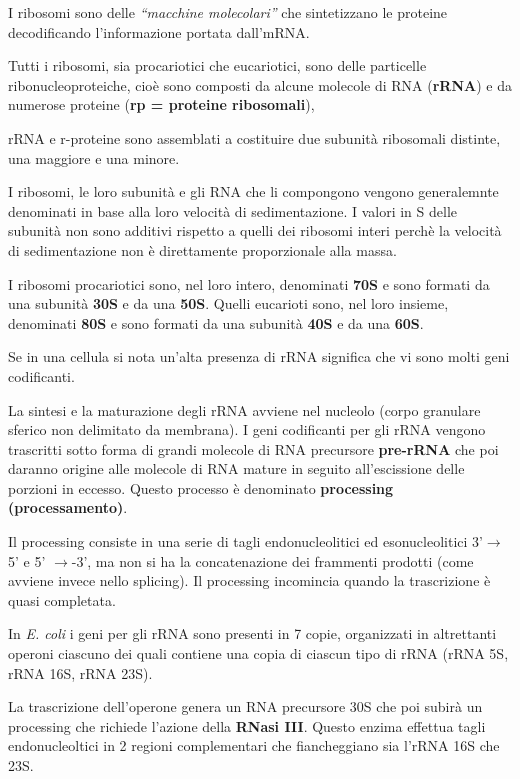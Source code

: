 \documentclass[11pt]{book}
\begin{document}
I ribosomi sono delle \emph{``macchine molecolari''} che sintetizzano le
proteine decodificando l'informazione portata dall'mRNA.

Tutti i ribosomi, sia procariotici che eucariotici, sono delle
particelle ribonucleoproteiche, cioè sono composti da alcune molecole di
RNA (\textbf{rRNA}) e da numerose proteine (\textbf{rp = proteine
ribosomali}),

rRNA e r-proteine sono assemblati a costituire due subunità ribosomali
distinte, una maggiore e una minore.

I ribosomi, le loro subunità e gli RNA che li compongono vengono
generalemnte denominati in base alla loro velocità di sedimentazione. I
valori in S delle subunità non sono additivi rispetto a quelli dei
ribosomi interi perchè la velocità di sedimentazione non è direttamente
proporzionale alla massa.

I ribosomi procariotici sono, nel loro intero, denominati \textbf{70S} e
sono formati da una subunità \textbf{30S} e da una \textbf{50S}. Quelli
eucarioti sono, nel loro insieme, denominati \textbf{80S} e sono formati
da una subunità \textbf{40S} e da una \textbf{60S}.

Se in una cellula si nota un'alta presenza di rRNA significa che vi sono
molti geni codificanti.

La sintesi e la maturazione degli rRNA avviene nel nucleolo (corpo
granulare sferico non delimitato da membrana). I geni codificanti per
gli rRNA vengono trascritti sotto forma di grandi molecole di RNA
precursore \textbf{pre-rRNA} che poi daranno origine alle molecole di
RNA mature in seguito all'escissione delle porzioni in eccesso. Questo
processo è denominato \textbf{processing (processamento)}.

Il processing consiste in una serie di tagli endonucleolitici ed
esonucleolitici 3'\(\rightarrow\) 5' e 5' \(\rightarrow\)-3', ma non si
ha la concatenazione dei frammenti prodotti (come avviene invece nello
splicing). Il processing incomincia quando la trascrizione è quasi
completata.

In \emph{E. coli} i geni per gli rRNA sono presenti in 7 copie,
organizzati in altrettanti operoni ciascuno dei quali contiene una copia
di ciascun tipo di rRNA (rRNA 5S, rRNA 16S, rRNA 23S).

La trascrizione dell'operone genera un RNA precursore 30S che poi subirà
un processing che richiede l'azione della \textbf{RNasi III}. Questo
enzima effettua tagli endonucleoltici in 2 regioni complementari che
fiancheggiano sia l'rRNA 16S che 23S.
\end{document}
